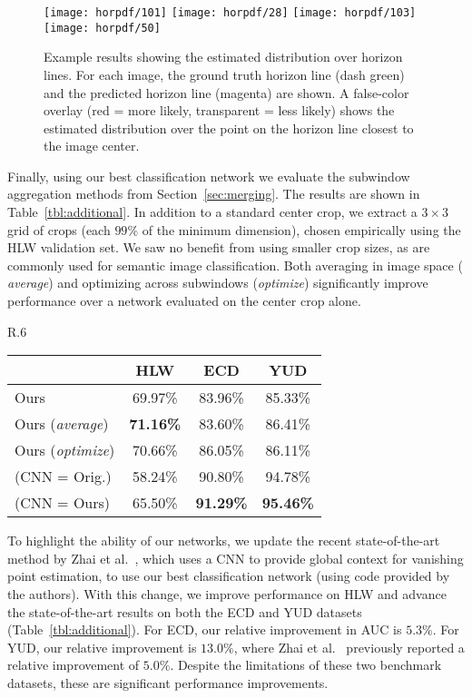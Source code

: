 \documentclass{bmvc2k}
\newcommand{\secref}[1]{Section~\ref{sec:#1}}
\newcommand{\tblref}[1]{Table~\ref{tbl:#1}}
\begin{document}
\begin{figure}
  \centering
  \texttt{[image: horpdf/101]}
  \texttt{[image: horpdf/28]}
  \texttt{[image: horpdf/103]}
  \texttt{[image: horpdf/50]}

  \caption{Example results showing the estimated distribution over
    horizon lines. For each image, the ground truth horizon line (dash
    green) and the predicted horizon line (magenta) are shown.  A
    false-color overlay (red = more likely, transparent = less likely)
    shows the estimated distribution over the point on the horizon
    line closest to the image center.}

  \label{fig:horizon_pdf}
\end{figure}

Finally, using our best classification network we evaluate the
subwindow aggregation methods from \secref{merging}. The results are
shown in \tblref{additional}. In addition to a standard center crop,
we extract a $3 \times 3$ grid of crops (each $99\%$ of the minimum
dimension), chosen empirically using the HLW validation set. We saw no
benefit from using smaller crop sizes, as are commonly used for
semantic image classification. Both averaging in image space ({\em
average}) and optimizing across subwindows ({\em optimize})
significantly improve performance over a network evaluated on the
center crop alone. 

\begin{wraptable}{R}{.6\linewidth}
  \centering
  \caption{Evaluation of post-processing strategies.}
  \begin{tabular}{@{}lccc@{}}
    \toprule
    & HLW & ECD & YUD\\
    \hline
    Ours
    & 69.97\% & 83.96\% & 85.33\% \\
    Ours ({\em average}) 
    & \textbf{71.16\%} & 83.60\% & 86.41\% \\
    Ours ({\em optimize}) 
    & 70.66\% & 86.05\% & 86.11\% \\
    \midrule
    \cite{zhai2016context} (CNN = Orig.) 
      & 58.24\% & 90.80\% & 94.78\% \\
    \cite{zhai2016context} (CNN = Ours) 
    & 65.50\% & \textbf{91.29\%} & \textbf{95.46\%} \\
    \bottomrule
  \end{tabular}
  \label{tbl:additional}
\end{wraptable}

To highlight the ability of our networks, we update the recent
state-of-the-art method by Zhai et al.~\cite{zhai2016context}, which uses
a CNN to provide global context for vanishing point estimation, to use
our best classification network (using code provided by the authors).
With this change, we improve performance on HLW and advance the
state-of-the-art results on both the ECD and YUD datasets
(\tblref{additional}).  For ECD, our relative improvement in AUC is
$5.3\%$.  For YUD, our relative improvement is $13.0\%$, where Zhai et
al.~\cite{zhai2016context} previously reported a relative improvement
of $5.0\%$. Despite the limitations of these two benchmark datasets,
these are significant performance improvements. 
\end{document}
